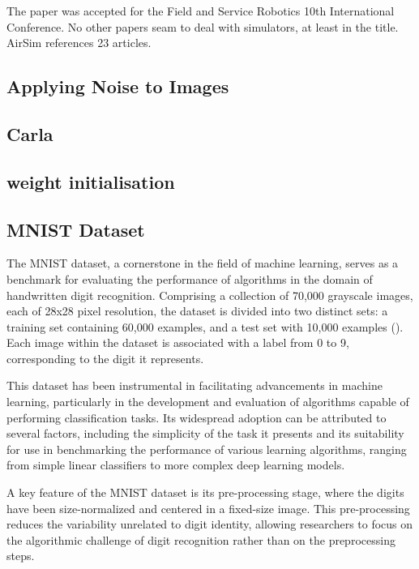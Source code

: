 The paper was accepted for the Field and Service Robotics 10th International Conference. No other papers seam to deal with simulators, at least in the title. AirSim references 23 articles.

\subsection{Applying Noise to Images}

\subsection{Carla}

\subsection{weight initialisation}

\subsection{MNIST Dataset}

The MNIST dataset, a cornerstone in the field of machine learning, serves as a benchmark for evaluating the performance of algorithms in the domain of handwritten digit recognition. Comprising a collection of 70,000 grayscale images, each of 28x28 pixel resolution, the dataset is divided into two distinct sets: a training set containing 60,000 examples, and a test set with 10,000 examples (\cite{LeCun1998}). Each image within the dataset is associated with a label from 0 to 9, corresponding to the digit it represents.

This dataset has been instrumental in facilitating advancements in machine learning, particularly in the development and evaluation of algorithms capable of performing classification tasks. Its widespread adoption can be attributed to several factors, including the simplicity of the task it presents and its suitability for use in benchmarking the performance of various learning algorithms, ranging from simple linear classifiers to more complex deep learning models.

A key feature of the MNIST dataset is its pre-processing stage, where the digits have been size-normalized and centered in a fixed-size image. This pre-processing reduces the variability unrelated to digit identity, allowing researchers to focus on the algorithmic challenge of digit recognition rather than on the preprocessing steps.

